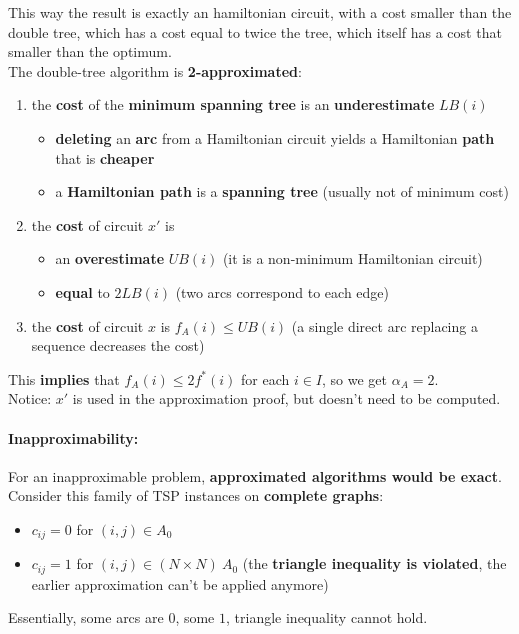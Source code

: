 This way the result is exactly an hamiltonian circuit, with a cost smaller than the double tree, which has a cost equal to twice the tree, which itself has a cost that smaller than the optimum.\\

The double-tree algorithm is \textbf{2-approximated}:
\begin{enumerate}
	\item the \textbf{cost} of the \textbf{minimum spanning tree} is an \textbf{underestimate} $LB (i )$
	\begin{itemize}
		\item \textbf{deleting} an \textbf{arc} from a Hamiltonian circuit yields a Hamiltonian \textbf{path} that is \textbf{cheaper}
		\item a \textbf{Hamiltonian path} is a \textbf{spanning tree} (usually not of minimum cost)
	\end{itemize}
	\item the \textbf{cost} of circuit $x'$ is
	\begin{itemize}
		\item an \textbf{overestimate} $UB (i )$ (it is a non-minimum Hamiltonian circuit)
		\item \textbf{equal} to $2LB (i )$ (two arcs correspond to each edge)
	\end{itemize}
	\item the \textbf{cost} of circuit $x$ is $f_A (i ) \leq UB (i )$ (a single direct arc replacing a sequence decreases the cost)
\end{enumerate}
This \textbf{implies} that $f_A (i ) \leq 2f^\ast (i )$ for each $i \in I$, so we get $\alpha_A = 2$.\\

Notice: $x'$ is used in the approximation proof, but doesn't need to be computed.\\

\newpage

\paragraph{Inapproximability:} For an inapproximable problem, \textbf{approximated algorithms would be exact}.\\
Consider this family of TSP instances on \textbf{complete graphs}:
\begin{itemize}
	\item $c_{ij} = 0$ for $(i, j) \in A_0$
	\item $c_{ij} = 1$ for $(i, j) \in  (N \times N) \ A_0$ (the \textbf{triangle inequality is violated}, the earlier approximation can't be applied anymore)
\end{itemize}
Essentially, some arcs are $0$, some $1$, triangle inequality cannot hold.\\

